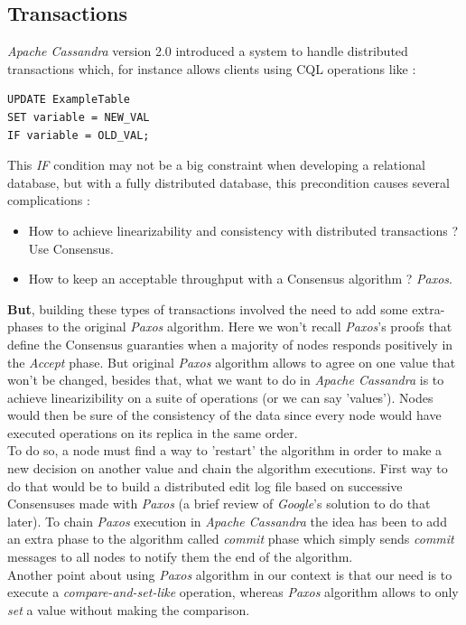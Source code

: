 \documentclass[a4paper]{report}
\newcommand{\ca}{\emph{Apache Cassandra\xspace}}
\newcommand{\px}{\emph{Paxos\xspace}}
\begin{document}
\subsection{Transactions}
\ca{} version 2.0 introduced a system to handle distributed transactions which, for instance allows clients using CQL operations like :
\vspace{0.7cm}
\begin{lstlisting}[label=cql-ex-1, caption=CQL Update Example, style=CQL]
UPDATE ExampleTable
SET variable = NEW_VAL
IF variable = OLD_VAL;
\end{lstlisting}
\vspace{0.7cm}
This \emph{IF} condition may not be a big constraint when developing a relational database, but with a fully distributed database, this precondition causes several complications : 
\begin{itemize}
	\item How to achieve linearizability and consistency with distributed transactions ? Use Consensus.
	\item How to keep an acceptable throughput with a Consensus algorithm ? \px{}\cite{Lamport1}.
\end{itemize}
{\bfseries But}, building these types of transactions involved the need to add some extra-phases to the original \px{} algorithm. Here we won't recall \px{}'s proofs that define the Consensus guaranties when a majority of nodes responds positively in the \emph{Accept} phase. But original \px{} algorithm allows to agree on one value that won't be changed, besides that, what we want to do in \ca{} is to achieve linearizibility on a suite of operations (or we can say 'values'). Nodes would then be sure of the consistency of the data since every node would have executed operations on its replica in the same order. \\
To do so, a node must find a way to 'restart' the algorithm in order to make a new decision on another value and chain the algorithm executions. First way to do that would be to build a distributed edit log file based on successive Consensuses made with \px{} (a brief review of \emph{Google}'s solution to do that later). To chain \px{} execution in \ca{} the idea has been to add an extra phase to the algorithm called \emph{commit} phase which simply sends \emph{commit} messages to all nodes to notify them the end of the algorithm.\\
Another point about using \px{} algorithm in our context is that our need is to execute a \emph{compare-and-set-like} operation, whereas \px{} algorithm allows to only \emph{set} a value without making the comparison. \\
\end{document}
